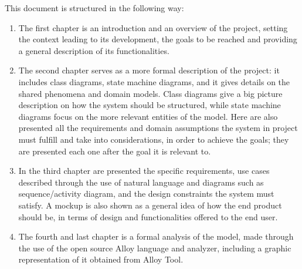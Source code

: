 \documentclass[../../main.tex]{subfiles}
\begin{document}
This document is structured in the following way:

\begin{enumerate}
    \item The first chapter is an introduction and an overview of the project, setting the context leading to its development, 
          the goals to be reached and providing a general description of its functionalities.

    \item The second chapter serves as a more formal description of the project: it includes class diagrams, state machine diagrams, 
          and it gives details on the shared phenomena and domain models. Class diagrams give a big picture description on how the system should be structured,
          while state machine diagrams focus on the more relevant entities of the model. Here are also presented all the requirements and domain assumptions 
          the system in project must fulfill and take into considerations, in order to achieve the goals; they are presented each one after the goal it is relevant to.

    \item In the third chapter are presented the specific requirements, use cases described through the use of natural language and diagrams such as sequence/activity diagram, 
          and the design constraints the system must satisfy. A mockup is also shown as a general idea of how the end product should be, in terms of design and functionalities 
          offered to the end user.

    \item The fourth and last chapter is a formal analysis of the model, made through the use of the open source Alloy language and analyzer, 
          including a graphic representation of it obtained from Alloy Tool.
\end{enumerate}
\end{document}
